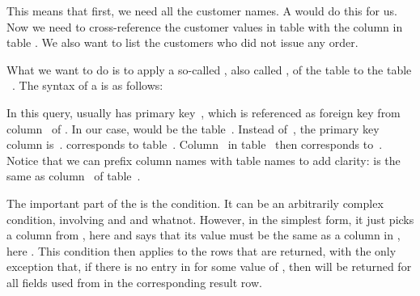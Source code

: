 This means that first, we need all the customer names.
A  would do this for us.
Now we need to cross-reference the customer  values in table  with the column  in table .
We also want to list the customers who did not issue any order.%
%
%
%
\begin{sloppypar}%
What we want to do is to apply a so-called , also called , of the table  to the table ~\cite{PGDG:PD:JT}.
The syntax of a  is as follows:%
\end{sloppypar}%
%
%
%
%
%
%
In this query, usually  has primary key~, which is referenced as foreign key from column~ of .
In our case,  would be the table~.
Instead of~, the primary key column is~.
 corresponds to table~.
Column~ in table~ then corresponds to~.
Notice that we can prefix column names with table names to add clarity:
 is the same as column~ of table~.

The important part of the  is the  condition.
It can be an arbitrarily complex condition, involving  and  and whatnot.
However, in the simplest form, it just picks a column from , here  and says that its value must be the same as a column in , here .%
This condition then applies to the rows that are returned, with the only exception that, if there is no entry in  for some value of , then  will be returned for all fields used from  in the corresponding result row.

